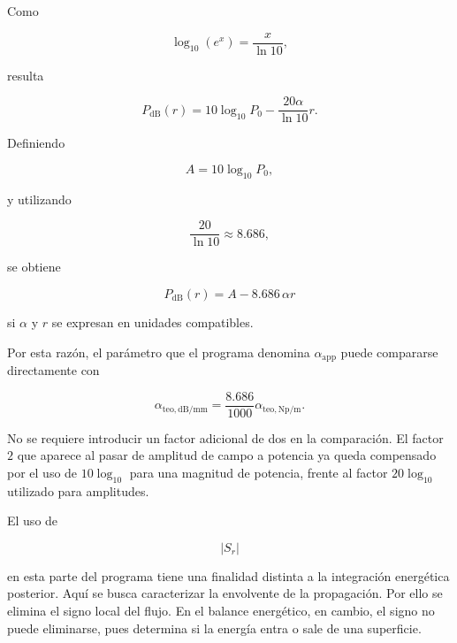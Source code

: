 Como

\begin{equation}
\log_{10}(e^x)
=
\frac{x}{\ln 10},
\end{equation}

resulta

\begin{equation}
P_{\mathrm{dB}}(r)
=
10\log_{10}P_0
-
\frac{20\alpha}{\ln 10}r.
\end{equation}

Definiendo

\begin{equation}
A
=
10\log_{10}P_0,
\end{equation}

y utilizando

\begin{equation}
\frac{20}{\ln10}
\approx
8.686,
\end{equation}

se obtiene

\begin{equation}
\boxed{
P_{\mathrm{dB}}(r)
=
A
-
8.686\,\alpha r
}
\label{eq:perfil_db_alpha}
\end{equation}

si $\alpha$ y $r$ se expresan en unidades compatibles.

Por esta razón, el parámetro que el programa denomina $\alpha_{\mathrm{app}}$ puede compararse directamente con

\begin{equation}
\alpha_{\mathrm{teo,dB/mm}}
=
\frac{8.686}{1000}
\alpha_{\mathrm{teo,Np/m}}.
\end{equation}

No se requiere introducir un factor adicional de dos en la comparación. El factor $2$ que aparece al pasar de amplitud de campo a potencia ya queda compensado por el uso de $10\log_{10}$ para una magnitud de potencia, frente al factor $20\log_{10}$ utilizado para amplitudes.

El uso de

\begin{equation}
|S_r|
\end{equation}

en esta parte del programa tiene una finalidad distinta a la integración energética posterior. Aquí se busca caracterizar la envolvente de la propagación. Por ello se elimina el signo local del flujo. En el balance energético, en cambio, el signo no puede eliminarse, pues determina si la energía entra o sale de una superficie.

